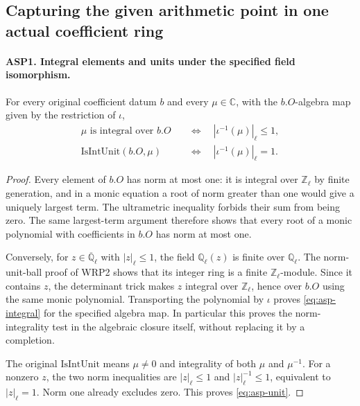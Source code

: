 \documentclass[11pt,a4paper]{article}
\numberwithin{equation}{section}
\theoremstyle{remark}\newtheorem{remark}[theorem]{Remark}
\begin{document}
\subsection{Capturing the given arithmetic point in one actual coefficient ring}

\paragraph{ASP1. Integral elements and units under the specified field isomorphism.}
\label{claim:ASP1}
For every original coefficient datum $b$ and every
$\mu\in\mathbb C$, with the $b.O$-algebra map given by
the restriction of $\iota$,
\begin{align}
 \mu\text{ is integral over }b.O
       &\quad\Longleftrightarrow\quad|\iota^{-1}(\mu)|_\ell\leq1,
       \label{eq:asp-integral}\\
 \mathrm{IsIntUnit}(b.O,\mu)
       &\quad\Longleftrightarrow\quad|\iota^{-1}(\mu)|_\ell=1.
       \label{eq:asp-unit}
\end{align}
\begin{proof}
Every element of $b.O$ has norm at most one: it is integral
over $\mathbb Z_\ell$ by finite generation, and in a monic
equation a root of norm greater than one would give a
uniquely largest term.  The ultrametric inequality forbids
their sum from being zero.  The same largest-term argument
therefore shows that every root of a monic polynomial with
coefficients in $b.O$ has norm at most one.

Conversely, for $z\in\overline{\mathbb Q}_\ell$ with
$|z|_\ell\leq1$, the field $\mathbb Q_\ell(z)$ is finite
over $\mathbb Q_\ell$.  The norm-unit-ball proof of WRP2
shows that its integer ring is a finite
$\mathbb Z_\ell$-module.  Since it contains $z$, the
determinant trick makes $z$ integral over
$\mathbb Z_\ell$, hence over $b.O$ using the same monic
polynomial.  Transporting the polynomial by $\iota$
proves \eqref{eq:asp-integral} for the specified algebra
map.  In particular this proves the norm-integrality
test in the algebraic closure itself, without replacing
it by a completion.

The original $\mathrm{IsIntUnit}$ means
$\mu\ne0$ and integrality of both $\mu$ and $\mu^{-1}$.
For a nonzero $z$, the two norm inequalities are
$|z|_\ell\leq1$ and $|z|_\ell^{-1}\leq1$, equivalent
to $|z|_\ell=1$.  Norm one already excludes zero.
This proves \eqref{eq:asp-unit}.
\end{proof}
\end{document}

